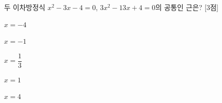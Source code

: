 두 이차방정식 $x^2-3x-4=0$, $3x^2-13x+4=0$의 공통인 근은? \mbox{[3점]}
\begin{choices32}{\rule[-3ex]{0pt}{8ex}$x=-4$}{\rule[-3ex]{0pt}{8ex}$x=-1$}{\rule[-3ex]{0pt}{8ex}$x=\dfrac{1}{3}$}{\rule[-3ex]{0pt}{8ex}$x=1$}{\rule[-3ex]{0pt}{8ex}$x=4$}\end{choices32}
